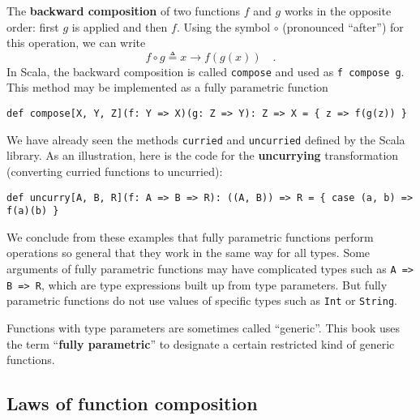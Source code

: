 The \textbf{backward composition} of
two functions $f$ and $g$ works in the opposite order: first $g$
is applied and then $f$. Using the symbol $\circ$ (pronounced \textsf{``}after\textsf{''})
for this operation, we can write
\begin{equation}
f\circ g\triangleq x\rightarrow f(g(x))\quad.\label{eq:def-of-backward-composition}
\end{equation}
In Scala, the backward composition is called \lstinline!compose!
and used as \lstinline!f compose g!. This method may be implemented
as a fully parametric function
\begin{lstlisting}
def compose[X, Y, Z](f: Y => X)(g: Z => Y): Z => X = { z => f(g(z)) }
\end{lstlisting}

We have already seen the methods \lstinline!curried! and \lstinline!uncurried!
defined by the Scala library. As an illustration, here is the code
for the \textbf{uncurrying} transformation (converting
curried functions to uncurried):
\begin{lstlisting}
def uncurry[A, B, R](f: A => B => R): ((A, B)) => R = { case (a, b) => f(a)(b) }
\end{lstlisting}

We conclude from these examples that fully parametric functions perform
operations so general that they work in the same way for all types.
Some arguments of fully parametric functions may have complicated
types such as \lstinline!A => B => R!, which are type expressions
built up from type parameters. But fully parametric functions do not
use values of specific types such as \lstinline!Int! or \lstinline!String!.

Functions with type parameters are sometimes called \textsf{``}generic\textsf{''}.
This book uses the term \textsf{``}\textbf{fully
parametric}\textsf{''} to designate a certain restricted kind of generic functions.

\subsection{Laws of function composition\label{subsec:Laws-of-function-composition}}

